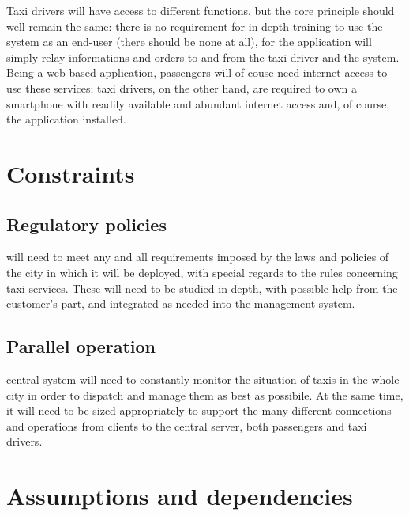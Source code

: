 Taxi drivers will have access to different functions, but the core principle should well remain the same: there is no requirement for in-depth training to use the system as an end-user (there should be none at all), for the application will simply relay informations and  orders to and from the taxi driver and the system. Being a web-based application, passengers will of couse need internet access to use these services; taxi drivers, on the other hand, are required to own a smartphone with readily available and abundant internet access and, of course, the application installed.

\section{Constraints}

\subsection{Regulatory policies}
\mts{} will need to meet any and all requirements imposed by the laws and policies of the city in which it will be deployed, with special regards to the rules concerning taxi services. These will need to be studied in depth, with possible help from the customer's part, and integrated as needed into the management system.

\subsection{Parallel operation}
\mts{} central system will need to constantly monitor the situation of taxis in the whole city in order to dispatch and manage them as best as possibile. At the same time, it will need to be sized appropriately to support the many different connections and operations from clients to the central server, both passengers and taxi drivers.

\section{Assumptions and dependencies}
\label{sec:assumptions}


